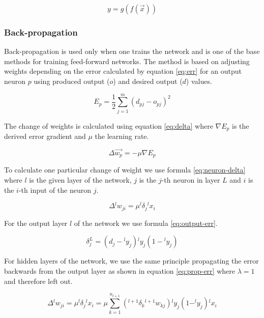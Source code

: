 \begin{equation}
    y = g( f( \vec{x} ) )
    \label{eq:output}
\end{equation}


\subsubsection{Back-propagation}
Back-propagation is used only when one trains the network and is one of the base methods for training feed-forward networks. The method is based on adjusting weights depending on the error calculated by equation \ref{eq:err} for an output neuron $ p $ using produced output ($ o $) and desired output ($ d $) values.

\begin{equation}
    E_p = \frac{1}{2} \sum_{j = 1}^{m} (d_{pj} - o_{pj})^2
    \label{eq:err}
\end{equation}

The change of weights is calculated using equation \ref{eq:delta} where $ \nabla E_p $ is the derived error gradient and $ \mu $ the learning rate.

\begin{equation}
    \Delta \vec{w_p} = -\mu \nabla E_p
    \label{eq:delta}
\end{equation}

To calculate one particular change of weight we use formula \ref{eq:neuron-delta} where $ l $ is the given layer of the network, $ j $ is the $j$-th neuron in layer $ L $ and $ i $ is the $i$-th input of the neuron $ j $.

\begin{equation}
    \Delta {^lw}_{ji} = \mu {^l\delta}_j {^lx}_i
    \label{eq:neuron-delta}
\end{equation}

For the output layer $ l $ of the network we use formula \ref{eq:output-err}.

\begin{equation}
    \delta_j^L = (d_j - {^ly}_j) {^ly}_j(1 - {^ly}_j)
    \label{eq:output-err}
\end{equation}

For hidden layers of the network, we use the same principle propagating the error backwards from the output layer as shown in equation \ref{eq:prop-err} where $\lambda = 1$ and therefore left out.

\begin{equation}
    \Delta {^l w}_{ji} = \mu {^l\delta}_j {^lx}_i = \mu \sum_{k = 1}^{n_{l+1}} (^{l+1}\delta_k {^{l+1}w}_{kj}) {^ly}_j (1 - ^ly_j){^lx}_i
    \label{eq:prop-err}
\end{equation}


